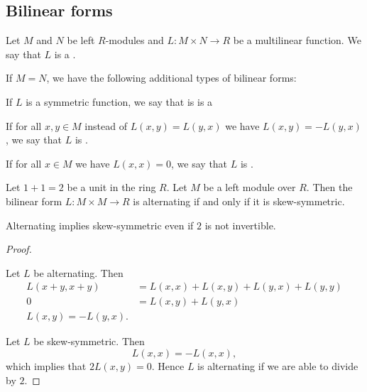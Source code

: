 \subsection{Bilinear forms}\label{subsec:bilinear_forms}

\begin{definition}\label{def:bilinear_form}\cite[249]{Knapp2016BAlg}
  Let \( M \) and \( N \) be left \( R \)-modules and \( L: M \times N \to R \) be a multilinear function. We say that \( L \) is a .

  If \( M = N \), we have the following additional types of bilinear forms:
  \begin{defenum}
     If \( L \) is a symmetric function, we say that is is a 

     If for all \( x, y \in M \) instead of \( L(x, y) = L(y, x) \) we have \( L(x, y) = -L(y, x) \), we say that \( L \) is .

     If for all \( x \in M \) we have \( L(x, x) = 0 \), we say that \( L \) is .
  \end{defenum}
\end{definition}

\begin{proposition}\label{thm:skew_symmetric_iff_alternating}
  Let \( 1 + 1 = 2 \) be a unit in the ring \( R \). Let \( M \) be a left module over \( R \). Then the bilinear form \( L: M \times M \to R \) is alternating if and only if it is skew-symmetric.

  Alternating implies skew-symmetric even if \( 2 \) is not invertible.
\end{proposition}
\begin{proof}\mbox{}
  \begin{description}
    \Implies Let \( L \) be alternating. Then
    \begin{align*}
      L(x + y, x + y) &= L(x, x) + L(x, y) + L(y, x) + L(y, y) \\
      0 &= L(x, y) + L(y, x) \\
      L(x, y) = -L(y, x).
    \end{align*}
  \end{description}

  \ImpliedBy Let \( L \) be skew-symmetric. Then
  \begin{equation*}
    L(x, x) = -L(x, x),
  \end{equation*}
  which implies that \( 2L(x, y) = 0 \). Hence \( L \) is alternating if we are able to divide by \( 2 \).
\end{proof}

